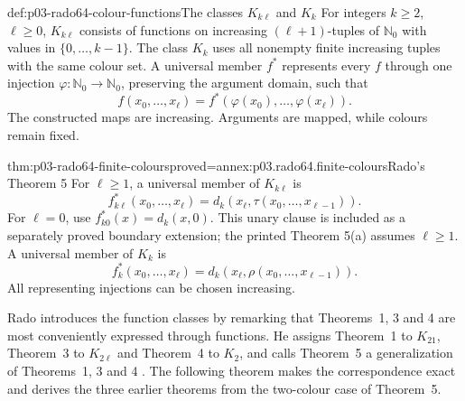 \begin{hbdefinition}{def:p03-rado64-colour-functions}{The classes \(K_{k\ell}\) and \(K_k\)}
For integers \(k\geq2\), \(\ell\geq0\), \(K_{k\ell}\) consists of functions
on increasing \((\ell+1)\)-tuples of \(\mathbb N_0\) with values in
\(\{0,\ldots,k-1\}\). The class \(K_k\) uses all nonempty finite increasing
tuples with the same colour set.
A universal member \(f^*\) represents every \(f\) through one injection
\(\varphi:\mathbb N_0\to\mathbb N_0\), preserving the argument domain, such that
\[
 f(x_0,\ldots,x_\ell)=
       f^*(\varphi(x_0),\ldots,\varphi(x_\ell)).
\]
The constructed maps are increasing. Arguments are mapped, while colours
remain fixed.
\end{hbdefinition}

\begin{hbtheorem}{thm:p03-rado64-finite-colours}{proved=annex:p03.rado64.finite-colours}{Rado's Theorem 5}
For \(\ell\geq1\), a universal member of \(K_{k\ell}\) is
\[
 f_{k\ell}^*(x_0,\ldots,x_\ell)
       =d_k(x_\ell,\tau(x_0,\ldots,x_{\ell-1})).
\]
For \(\ell=0\), use \(f_{k0}^*(x)=d_k(x,0)\).
This unary clause is included as a separately proved boundary extension;
the printed Theorem 5(a) assumes \(\ell\geq1\).
A universal member of \(K_k\) is
\[
 f_k^*(x_0,\ldots,x_\ell)=
       d_k(x_\ell,\rho(x_0,\ldots,x_{\ell-1})).
\]
All representing injections can be chosen increasing.
\end{hbtheorem}

Rado introduces the function classes by remarking that Theorems~1, 3
and 4 are most conveniently expressed through functions. He assigns
Theorem~1 to \(K_{21}\), Theorem~3 to \(K_{2\ell}\) and Theorem~4 to
\(K_2\), and calls Theorem~5 a generalization of Theorems~1, 3 and 4
\cite[\S3, p.~335]{Rado1964}. The following theorem makes the
correspondence exact and derives the three earlier theorems from the
two-colour case of Theorem~5.

